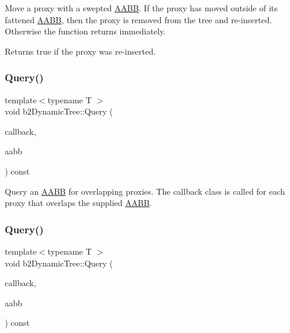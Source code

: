 Move a proxy with a swepted \hyperlink{classAABB}{A\+A\+BB}. If the proxy has moved outside of its fattened \hyperlink{classAABB}{A\+A\+BB}, then the proxy is removed from the tree and re-\/inserted. Otherwise the function returns immediately. \begin{DoxyReturn}{Returns}
true if the proxy was re-\/inserted. 
\end{DoxyReturn}
\mbox{\label{classb2DynamicTree_a324df3eb65dfc22d3dcdca387737b193}} 
\subsubsection{\texorpdfstring{Query()}{Query()}\hspace{0.1cm}{\footnotesize\ttfamily [1/2]}}
{\footnotesize\ttfamily template$<$typename T $>$ \\
void b2\+Dynamic\+Tree\+::\+Query (\begin{DoxyParamCaption}\item[{T $\ast$}]{callback,  }\item[{const \hyperlink{structb2AABB}{b2\+A\+A\+BB} \&}]{aabb }\end{DoxyParamCaption}) const}

Query an \hyperlink{classAABB}{A\+A\+BB} for overlapping proxies. The callback class is called for each proxy that overlaps the supplied \hyperlink{classAABB}{A\+A\+BB}. \mbox{\label{classb2DynamicTree_a324df3eb65dfc22d3dcdca387737b193}} 
\subsubsection{\texorpdfstring{Query()}{Query()}\hspace{0.1cm}{\footnotesize\ttfamily [2/2]}}
{\footnotesize\ttfamily template$<$typename T $>$ \\
void b2\+Dynamic\+Tree\+::\+Query (\begin{DoxyParamCaption}\item[{T $\ast$}]{callback,  }\item[{const \hyperlink{structb2AABB}{b2\+A\+A\+BB} \&}]{aabb }\end{DoxyParamCaption}) const\hspace{0.3cm}{\ttfamily [inline]}}

